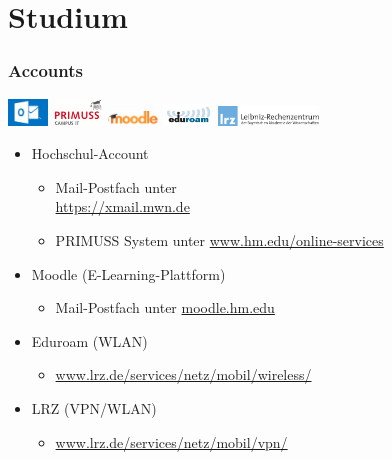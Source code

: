 \documentclass{beamer}
\begin{document}
    \section{Studium}
    
    \begin{frame}[t]
    	\frametitle{Accounts}
    	\qquad
    	\includegraphics[width=0.08\textwidth]{xmail.jpg}
    	\qquad
    	\includegraphics[width=0.1\textwidth]{primuss.jpg}
    	\qquad
    	\includegraphics[width=0.1\textwidth]{moodle.png}
    	\qquad
    	\includegraphics[width=0.1\textwidth]{eduroam.png}
    	\qquad
    	\includegraphics[width=0.2\textwidth]{lrz.png}
    	\begin{itemize} 
    		\item Hochschul-Account
    		\begin{itemize}
    			\item Mail-Postfach unter \\ \url{https://xmail.mwn.de}
    			\item PRIMUSS System unter \url{www.hm.edu/online-services}
    		\end{itemize}
    		\pause
    		\item Moodle (E-Learning-Plattform)
    		\begin{itemize}
    			\item Mail-Postfach unter \url{moodle.hm.edu}
    		\end{itemize}
    		\pause
    		\item Eduroam (WLAN)
    		\begin{itemize}
    			\item \url{www.lrz.de/services/netz/mobil/wireless/}
    		\end{itemize}
    		\pause
    		\item LRZ (VPN/WLAN)
    		\begin{itemize}
    			\item \url{www.lrz.de/services/netz/mobil/vpn/}
    		\end{itemize}
    	\end{itemize}
    \end{frame}
    
\end{document}
